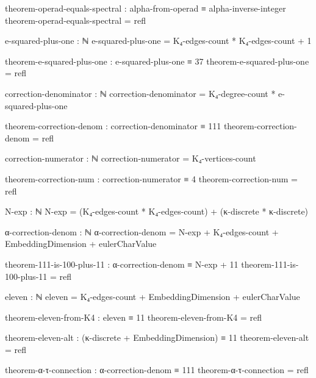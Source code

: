 \documentclass[11pt,a4paper]{book}
\begin{document}
\begin{code}
theorem-operad-equals-spectral : alpha-from-operad ≡ alpha-inverse-integer
theorem-operad-equals-spectral = refl

e-squared-plus-one : ℕ
e-squared-plus-one = K₄-edges-count * K₄-edges-count + 1

theorem-e-squared-plus-one : e-squared-plus-one ≡ 37
theorem-e-squared-plus-one = refl

correction-denominator : ℕ
correction-denominator = K₄-degree-count * e-squared-plus-one

theorem-correction-denom : correction-denominator ≡ 111
theorem-correction-denom = refl

correction-numerator : ℕ
correction-numerator = K₄-vertices-count

theorem-correction-num : correction-numerator ≡ 4
theorem-correction-num = refl

N-exp : ℕ
N-exp = (K₄-edges-count * K₄-edges-count) + (κ-discrete * κ-discrete)

α-correction-denom : ℕ
α-correction-denom = N-exp + K₄-edges-count + EmbeddingDimension + eulerCharValue

theorem-111-is-100-plus-11 : α-correction-denom ≡ N-exp + 11
theorem-111-is-100-plus-11 = refl

eleven : ℕ
eleven = K₄-edges-count + EmbeddingDimension + eulerCharValue

theorem-eleven-from-K4 : eleven ≡ 11
theorem-eleven-from-K4 = refl

theorem-eleven-alt : (κ-discrete + EmbeddingDimension) ≡ 11
theorem-eleven-alt = refl

theorem-α-τ-connection : α-correction-denom ≡ 111
theorem-α-τ-connection = refl
\end{code}
\end{document}
